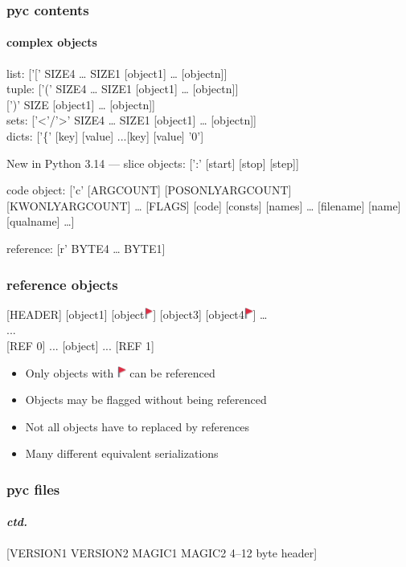 \documentclass[]{beamer}
\newcommand{\flag}{\includegraphics[height=1em]{images/flag.png}}
\begin{document}
\begin{frame}
  \frametitle{pyc contents}
  \framesubtitle{complex objects}

  \pause

  list: ['[' SIZE4 … SIZE1 [object1] … [objectn]]\\\pause
  tuple: ['(' SIZE4 … SIZE1 [object1] … [objectn]]\\\pause
  \phantom{tuple:} [')' SIZE [object1] … [objectn]]\\\pause
  sets: ['<'/'>' SIZE4 … SIZE1 [object1] … [objectn]]\\\pause
  dicts: ['\{' [key] [value] ...[key] [value] '0']\\\pause

  New in Python 3.14 — slice objects: [':' [start] [stop] [step]]
  \\\pause

  code object: ['c' [ARGCOUNT] [POSONLYARGCOUNT] [KWONLYARGCOUNT] … [FLAGS] [code] [consts] [names] … [filename] [name] [qualname] …]
  \\\pause

  reference: [r' BYTE4 … BYTE1]
\end{frame}

\begin{frame}
  \frametitle{reference objects}

  \hfill

  [HEADER] [object1] [object\flag] [object3] [object4\flag] … \\{}
  ...\\\pause
  {}[REF 0] ... [object] ... [REF 1]

  \vfill
  \pause

  \begin{itemize}
  \item Only objects with \flag{} can be referenced
  \item Objects may be flagged without being referenced
  \item Not all objects have to replaced by references
  \item Many different equivalent serializations
  \end{itemize}
\end{frame}

\begin{frame}
  \frametitle{pyc files}
  \framesubtitle{\textit{ctd.}}

  \pause

  [VERSION1 VERSION2 MAGIC1 MAGIC2 4–12 byte header]\\
\end{frame}
\end{document}
